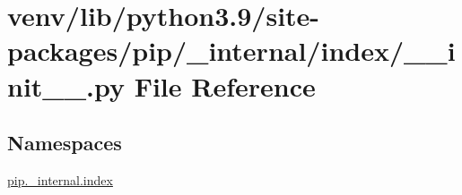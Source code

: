 \hypertarget{venv_2lib_2python3_89_2site-packages_2pip_2__internal_2index_2____init_____8py}{}\section{venv/lib/python3.9/site-\/packages/pip/\+\_\+internal/index/\+\_\+\+\_\+init\+\_\+\+\_\+.py File Reference}
\label{venv_2lib_2python3_89_2site-packages_2pip_2__internal_2index_2____init_____8py}
\subsection*{Namespaces}
\begin{DoxyCompactItemize}
\item 
 \hyperlink{namespacepip_1_1__internal_1_1index}{pip.\+\_\+internal.\+index}
\end{DoxyCompactItemize}
